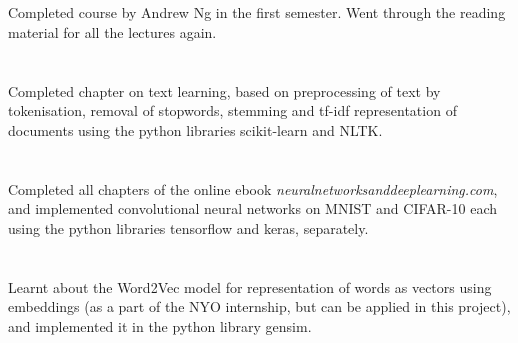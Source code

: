 \documentclass{report}
\begin{document}
        \\[-9mm]
        	
        	\paragraph{}{\fontsize{13}{16}\selectfont Completed course by Andrew Ng in the first semester. Went through the reading material for all the lectures again.}\\[+7mm]
        
        \\[-9mm]
        	\paragraph{}{\fontsize{13}{16}\selectfont Completed chapter on text learning, based on preprocessing of text by tokenisation, removal of stopwords, stemming and tf-idf representation of documents using the python libraries scikit-learn and NLTK.}\\[+7mm]
        
        \\[-9mm]
        	\paragraph{}{\fontsize{13}{16}\selectfont Completed all chapters of the online ebook \textit{neuralnetworksanddeeplearning.com}, and implemented convolutional neural networks on MNIST and CIFAR-10 each using the python libraries tensorflow and keras, separately.}\\[+7mm]
        
        \\[-9mm]
        	\paragraph{}{\fontsize{13}{16}\selectfont Learnt about the Word2Vec model for representation of words as vectors using embeddings (as a part of the NYO internship, but can be applied in this project), and implemented it in the python library gensim.}
        
    
\end{document}
